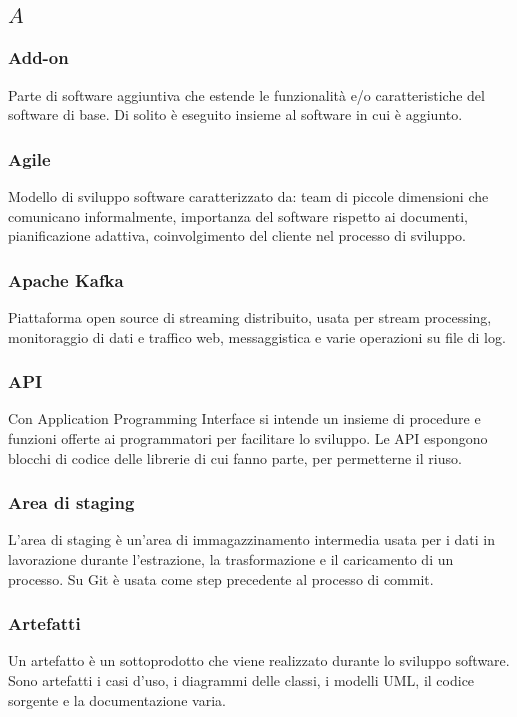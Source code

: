 \subsection*{\quad$A\quad$}
\subsubsection*{Add-on}
Parte di software aggiuntiva che estende le funzionalità e/o caratteristiche del software di base. Di solito è eseguito insieme al software in cui è aggiunto.

\subsubsection*{Agile}
Modello di sviluppo software caratterizzato da: team di piccole dimensioni che comunicano informalmente, importanza del software rispetto ai documenti, pianificazione adattiva, coinvolgimento del cliente nel processo di sviluppo.


\subsubsection*{Apache Kafka}
Piattaforma open source di streaming distribuito, usata per stream processing, monitoraggio di dati e traffico web, messaggistica e varie operazioni su file di log.

\subsubsection*{API}
Con Application Programming Interface si intende un insieme di procedure e funzioni offerte ai programmatori per facilitare lo sviluppo. Le API espongono blocchi di codice delle librerie di cui fanno parte, per permetterne il riuso.

\subsubsection*{Area di staging}
L'area di staging è un'area di immagazzinamento intermedia usata per i dati in lavorazione durante l'estrazione, la trasformazione e il caricamento di un processo. Su Git è usata come step precedente al processo di commit.

\subsubsection*{Artefatti}
Un artefatto è un sottoprodotto che viene realizzato durante lo sviluppo software. Sono artefatti i casi d'uso, i diagrammi delle classi, i modelli UML\glo, il codice sorgente e la documentazione varia.

